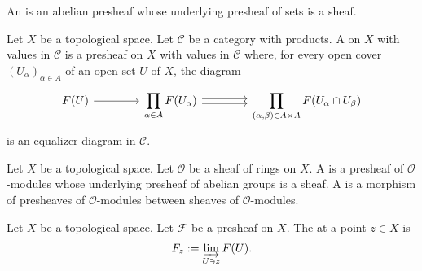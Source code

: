 \documentclass [11 pt, oneside] {article}
\begin{document}
\begin{definition}[ ]\label{}\text{}
An  is an abelian presheaf whose underlying presheaf of sets is a sheaf.
\end{definition}


\begin{definition}\label{}\text{}
Let $X$ be a topological space. Let $\mathscr{C}$ be a category with products. A  on $X$ with values in $\mathscr{C}$ is a presheaf on $X$ with values in $\mathscr{C}$ where, for every open cover $(U_{\alpha}) _{\alpha\in A}$ of an open set $U$ of $X$, the diagram
\[
\begin{tikzcd}[column sep = 4 em]
	\mathscr{F}(U) \ar[r] & \displaystyle \prod_{\alpha\in A} \mathscr{F}(U_{\alpha}) \ar[r,shift left = 0.5 ex] \ar[r, shift right = 0.5 ex] &\displaystyle \prod_{(\alpha,\beta)\in A\times A} \mathscr{F}(U_{\alpha}\cap U_{\beta})
\end{tikzcd}
\]
is an equalizer diagram in $\mathscr{C}$.
\end{definition}

\begin{definition}\label{}\text{}
Let $X$ be a topological space. Let $\mathscr{O}$ be a sheaf of rings on $X$. A  is a presheaf of $\mathscr{O}$-modules whose underlying presheaf of abelian groups is a sheaf. A  is a morphism of presheaves of $\mathscr{O}$-modules between sheaves of $\mathscr{O}$-modules.
\end{definition}

\begin{definition}[ ]\label{}\text{}
Let $X$ be a topological space. Let $\mathscr{F}$ be a presheaf on $X$. The  at a point $z\in X$ is
\begin{align*}
	\mathscr{F}_{z} := \varinjlim_{U\ni z} \mathscr{F}(U).
\end{align*}
\end{definition}
\end{document}
